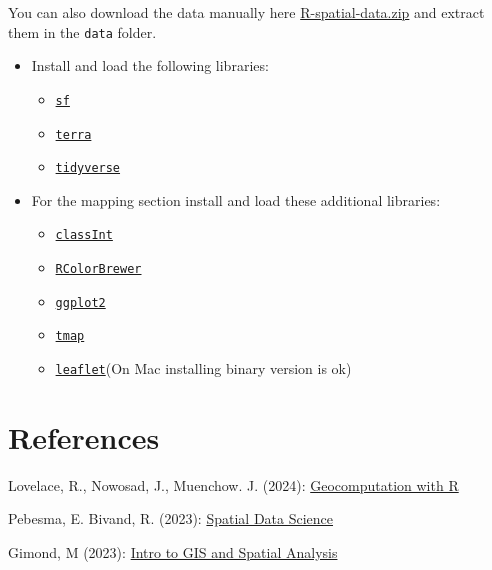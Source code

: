 \documentclass[
]{book}
\providecommand{\tightlist}{%
  \setlength{\itemsep}{0pt}\setlength{\parskip}{0pt}}
\begin{document}
You can also download the data manually here \href{https://github.com/cengel/R-spatial/raw/master/data/R-spatial-data.zip}{R-spatial-data.zip} and extract them in the \texttt{data} folder.

\begin{itemize}
\tightlist
\item
  Install and load the following libraries:

  \begin{itemize}
  \tightlist
  \item
    \href{https://cran.r-project.org/package=sf}{\texttt{sf}}
  \item
    \href{https://cran.r-project.org/package=terra}{\texttt{terra}}
  \item
    \href{https://cran.r-project.org/package=tidyverse}{\texttt{tidyverse}}
  \end{itemize}
\item
  For the mapping section install and load these additional libraries:

  \begin{itemize}
  \tightlist
  \item
    \href{https://cran.r-project.org/package=classInt}{\texttt{classInt}}
  \item
    \href{https://cran.r-project.org/package=RColorBrewer}{\texttt{RColorBrewer}}
  \item
    \href{https://cran.r-project.org/package=ggplot2}{\texttt{ggplot2}}
  \item
    \href{https://cran.r-project.org/package=tmap}{\texttt{tmap}}
  \item
    \href{https://cran.r-project.org/package=leaflet}{\texttt{leaflet}}(On Mac installing binary version is ok)
  \end{itemize}
\end{itemize}

\hypertarget{references}{%
\section*{References}\label{references}}

Lovelace, R., Nowosad, J., Muenchow. J. (2024): \href{https://r.geocompx.org/}{Geocomputation with R}

Pebesma, E. Bivand, R. (2023): \href{https://r-spatial.org/book/}{Spatial Data Science}

Gimond, M (2023): \href{https://mgimond.github.io/Spatial/index.html}{Intro to GIS and Spatial Analysis}
\end{document}
